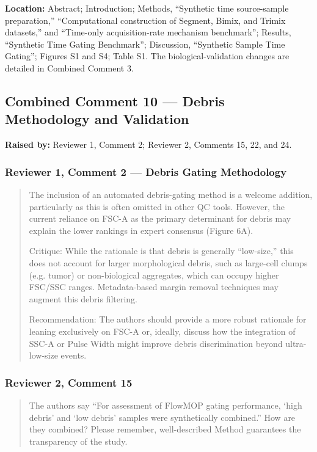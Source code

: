 \documentclass[
  11pt,
  a4paper,
]{article}
\begin{document}
\textbf{Location:} Abstract; Introduction; Methods, ``Synthetic time
source-sample preparation,'' ``Computational construction of Segment,
Bimix, and Trimix datasets,'' and ``Time-only acquisition-rate mechanism
benchmark''; Results, ``Synthetic Time Gating Benchmark''; Discussion,
``Synthetic Sample Time Gating''; Figures S1 and S4; Table S1. The
biological-validation changes are detailed in Combined Comment 3.

\subsection{Combined Comment 10 --- Debris Methodology and
Validation}\label{combined-comment-10--debris-methodology-and-validation}

\textbf{Raised by:} Reviewer 1, Comment 2; Reviewer 2, Comments 15, 22,
and 24.

\subsubsection{Reviewer 1, Comment 2 --- Debris Gating
Methodology}\label{reviewer-1-comment-2--debris-gating-methodology}

\begin{quote}
The inclusion of an automated debris-gating method is a welcome
addition, particularly as this is often omitted in other QC tools.
However, the current reliance on FSC-A as the primary determinant for
debris may explain the lower rankings in expert consensus (Figure 6A).

Critique: While the rationale is that debris is generally ``low-size,''
this does not account for larger morphological debris, such as
large-cell clumps (e.g. tumor) or non-biological aggregates, which can
occupy higher FSC/SSC ranges. Metadata-based margin removal techniques
may augment this debris filtering.

Recommendation: The authors should provide a more robust rationale for
leaning exclusively on FSC-A or, ideally, discuss how the integration of
SSC-A or Pulse Width might improve debris discrimination beyond
ultra-low-size events.
\end{quote}

\subsubsection{Reviewer 2, Comment 15}\label{reviewer-2-comment-15}

\begin{quote}
The authors say ``For assessment of FlowMOP gating performance, `high
debris' and `low debris' samples were synthetically combined.'' How are
they combined? Please remember, well-described Method guarantees the
transparency of the study.
\end{quote}
\end{document}
